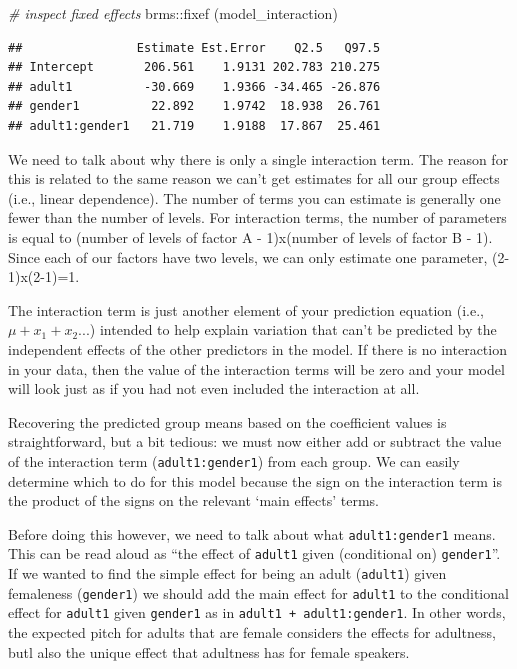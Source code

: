 \documentclass[
]{book}
\newenvironment{Shaded}{\begin{snugshade}}{\end{snugshade}}
\newcommand{\CommentTok}[1]{\textcolor[rgb]{0.56,0.35,0.01}{\textit{#1}}}
\newcommand{\FunctionTok}[1]{\textcolor[rgb]{0.00,0.00,0.00}{#1}}
\newcommand{\NormalTok}[1]{#1}
\newcommand{\SpecialCharTok}[1]{\textcolor[rgb]{0.00,0.00,0.00}{#1}}
\begin{document}
\begin{Shaded}
\begin{Highlighting}[]
\CommentTok{\# inspect fixed effects}
\NormalTok{brms}\SpecialCharTok{::}\FunctionTok{fixef}\NormalTok{ (model\_interaction)}
\end{Highlighting}
\end{Shaded}

\begin{verbatim}
##                Estimate Est.Error    Q2.5   Q97.5
## Intercept       206.561    1.9131 202.783 210.275
## adult1          -30.669    1.9366 -34.465 -26.876
## gender1          22.892    1.9742  18.938  26.761
## adult1:gender1   21.719    1.9188  17.867  25.461
\end{verbatim}

We need to talk about why there is only a single interaction term. The reason for this is related to the same reason we can't get estimates for all our group effects (i.e., linear dependence). The number of terms you can estimate is generally one fewer than the number of levels. For interaction terms, the number of parameters is equal to (number of levels of factor A - 1)x(number of levels of factor B - 1). Since each of our factors have two levels, we can only estimate one parameter, (2-1)x(2-1)=1.

The interaction term is just another element of your prediction equation (i.e., \(\mu + x_1+x_2...\)) intended to help explain variation that can't be predicted by the independent effects of the other predictors in the model. If there is no interaction in your data, then the value of the interaction terms will be zero and your model will look just as if you had not even included the interaction at all.

Recovering the predicted group means based on the coefficient values is straightforward, but a bit tedious: we must now either add or subtract the value of the interaction term (\texttt{adult1:gender1}) from each group. We can easily determine which to do for this model because the sign on the interaction term is the product of the signs on the relevant `main effects' terms.

Before doing this however, we need to talk about what \texttt{adult1:gender1} means. This can be read aloud as ``the effect of \texttt{adult1} given (conditional on) \texttt{gender1}''. If we wanted to find the simple effect for being an adult (\texttt{adult1}) given femaleness (\texttt{gender1}) we should add the main effect for \texttt{adult1} to the conditional effect for \texttt{adult1} given \texttt{gender1} as in \texttt{adult1\ +\ adult1:gender1}. In other words, the expected pitch for adults that are female considers the effects for adultness, butl also the unique effect that adultness has for female speakers.
\end{document}
